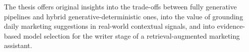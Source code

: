 \documentclass[12pt]{report}
\begin{document}
The thesis offers original insights into the trade-offs between fully generative pipelines and hybrid generative-deterministic ones, into the value of grounding daily marketing suggestions in real-world contextual signals, and into evidence-based model selection for the writer stage of a retrieval-augmented marketing assistant.

\tableofcontents

\newpage
{}









\end{document}
